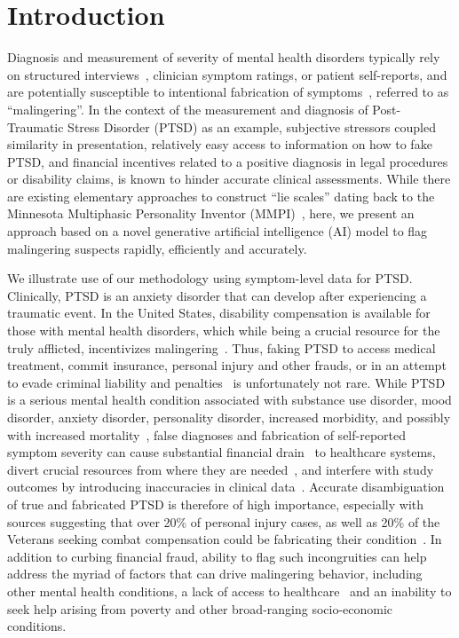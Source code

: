 \documentclass[onecolumn,10pt]{IEEEtran}
\begin{document}
\section*{Introduction}
Diagnosis and measurement of severity of mental health disorders  typically  rely  on structured interviews~\cite{ali2015multimodal}, clinician symptom ratings, or patient self-reports, and are potentially susceptible to  intentional fabrication of  symptoms~\cite{Rogers1997,rogers2008clinical},  referred to as ``malingering''. In the  context of the measurement and diagnosis of Post-Traumatic Stress Disorder (PTSD) as an example,  subjective stressors coupled similarity in presentation,   relatively easy access to information on  how to fake PTSD,  and financial  incentives related to a positive diagnosis  in  legal procedures or disability claims, is known to hinder accurate  clinical assessments.  While there are existing elementary approaches to construct ``lie scales'' dating back to the Minnesota Multiphasic Personality Inventor (MMPI)~\cite{butcher2010minnesota}, here, we present an approach based on a novel generative artificial intelligence (AI) model to flag malingering suspects rapidly, efficiently and accurately.

We illustrate use of our methodology using symptom-level data for PTSD. Clinically, PTSD is an anxiety disorder that can develop after experiencing a traumatic event. In the United States,  disability compensation is   available for  those with mental health disorders, which while being a crucial resource for the truly afflicted, incentivizes malingering~\cite{frueh2007us,taylor2007detection}.  Thus,  faking PTSD to access medical treatment, commit insurance, personal injury and other frauds, or in an attempt to evade criminal liability and penalties~\cite{guriel2003assessing,salloway1990opiate,resnick2008malingering,burkett1998stolen} is unfortunately not rare. While  PTSD is a serious mental health condition  associated with  substance use disorder, mood disorder, anxiety disorder,  personality disorder, increased morbidity,  and possibly with increased  mortality~\cite{goldstein2016epidemiology,schnurr2009posttraumatic}, false diagnoses and fabrication of self-reported symptom severity can cause substantial financial drain~\cite{lopiccolo1999current, oboler2000disability} to  healthcare systems, divert crucial resources from where they are needed~\cite{taylor2006clinician}, and interfere with study outcomes by introducing inaccuracies in clinical data~\cite{rosen2006dsm}. Accurate disambiguation of true and fabricated PTSD is therefore of high importance, especially with sources suggesting that over 20\% of  personal injury cases, as well as  20\%  of the Veterans seeking combat compensation could be  fabricating their condition~\cite{marx2011ptsd,rogers1994explanatory,leeshaley1997mmpi2,frueh2007us}. In addition to curbing  financial fraud, ability to flag such incongruities can help address the myriad of   factors that can drive malingering behavior, including other mental health conditions, a lack of access to healthcare~\cite{park2021race,muntaner2004socioeconomic} and  an inability to seek help arising from poverty and other broad-ranging socio-economic conditions.
\end{document}
